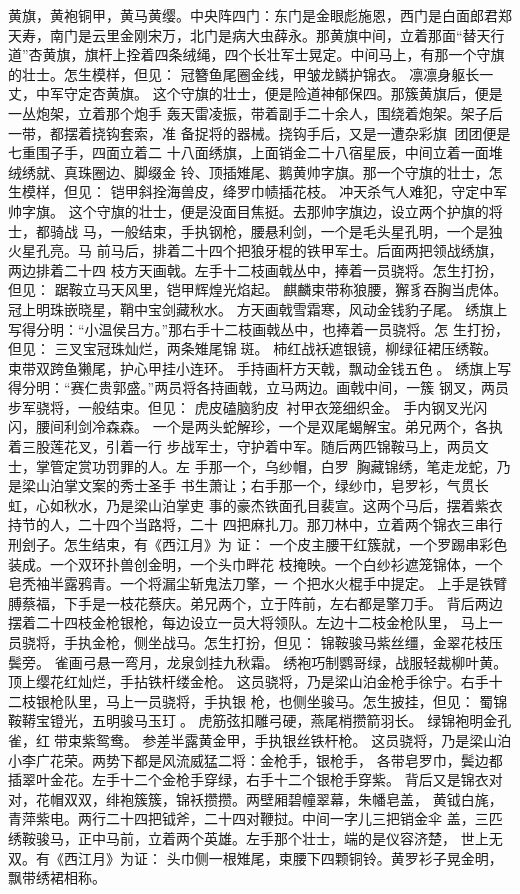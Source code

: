 黄旗，黄袍铜甲，黄马黄缨。中央阵四门：东门是金眼彪施恩，西门是白面郎君郑
天寿，南门是云里金刚宋万，北门是病大虫薛永。那黄旗中间，立着那面“替天行
道”杏黄旗，旗杆上拴着四条绒绳，四个长壮军士晃定。中间马上，有那一个守旗
的壮士。怎生模样，但见：
冠簪鱼尾圈金线，甲皱龙鳞护锦衣。
凛凛身躯长一丈，中军守定杏黄旗。
这个守旗的壮士，便是险道神郁保四。那簇黄旗后，便是一丛炮架，立着那个炮手
轰天雷凌振，带着副手二十余人，围绕着炮架。架子后一带，都摆着挠钩套索，准
备捉将的器械。挠钩手后，又是一遭杂彩旗，团团便是七重围子手，四面立着二
十八面绣旗，上面销金二十八宿星辰，中间立着一面堆绒绣就、真珠圈边、脚缀金
铃、顶插雉尾、鹅黄帅字旗。那一个守旗的壮士，怎生模样，但见：
铠甲斜拴海兽皮，绛罗巾帻插花枝。
冲天杀气人难犯，守定中军帅字旗。
这个守旗的壮士，便是没面目焦挺。去那帅字旗边，设立两个护旗的将士，都骑战
马，一般结束，手执钢枪，腰悬利剑，一个是毛头星孔明，一个是独火星孔亮。马
前马后，排着二十四个把狼牙棍的铁甲军士。后面两把领战绣旗，两边排着二十四
枝方天画戟。左手十二枝画戟丛中，捧着一员骁将。怎生打扮，但见：
踞鞍立马天风里，铠甲辉煌光焰起。
麒麟束带称狼腰，獬豸吞胸当虎体。
冠上明珠嵌晓星，鞘中宝剑藏秋水。
方天画戟雪霜寒，风动金钱豹子尾。
绣旗上写得分明：“小温侯吕方。”那右手十二枝画戟丛中，也捧着一员骁将。怎
生打扮，但见：
三叉宝冠珠灿烂，两条雉尾锦斑。
柿红战袄遮银镜，柳绿征裙压绣鞍。
束带双跨鱼獭尾，护心甲挂小连环。
手持画杆方天戟，飘动金钱五色。
绣旗上写得分明：“赛仁贵郭盛。”两员将各持画戟，立马两边。画戟中间，一簇
钢叉，两员步军骁将，一般结束。但见：
虎皮磕脑豹皮，衬甲衣笼细织金。
手内钢叉光闪闪，腰间利剑冷森森。
一个是两头蛇解珍，一个是双尾蝎解宝。弟兄两个，各执着三股莲花叉，引着一行
步战军士，守护着中军。随后两匹锦鞍马上，两员文士，掌管定赏功罚罪的人。左
手那一个，乌纱帽，白罗，胸藏锦绣，笔走龙蛇，乃是梁山泊掌文案的秀士圣手
书生萧让；右手那一个，绿纱巾，皂罗衫，气贯长虹，心如秋水，乃是梁山泊掌吏
事的豪杰铁面孔目裴宣。这两个马后，摆着紫衣持节的人，二十四个当路将，二十
四把麻扎刀。那刀林中，立着两个锦衣三串行刑刽子。怎生结束，有《西江月》为
证：
一个皮主腰干红簇就，一个罗踢串彩色装成。一个双环扑兽创金明，一个头巾畔花
枝掩映。一个白纱衫遮笼锦体，一个皂秃袖半露鸦青。一个将漏尘斩鬼法刀擎，一
个把水火棍手中提定。
上手是铁臂膊蔡福，下手是一枝花蔡庆。弟兄两个，立于阵前，左右都是擎刀手。
背后两边摆着二十四枝金枪银枪，每边设立一员大将领队。左边十二枝金枪队里，
马上一员骁将，手执金枪，侧坐战马。怎生打扮，但见：
锦鞍骏马紫丝缰，金翠花枝压鬓旁。
雀画弓悬一弯月，龙泉剑挂九秋霜。
绣袍巧制鹦哥绿，战服轻裁柳叶黄。
顶上缨花红灿烂，手拈铁杆缕金枪。
这员骁将，乃是梁山泊金枪手徐宁。右手十二枝银枪队里，马上一员骁将，手执银
枪，也侧坐骏马。怎生披挂，但见：
蜀锦鞍鞯宝镫光，五明骏马玉玎。
虎筋弦扣雕弓硬，燕尾梢攒箭羽长。
绿锦袍明金孔雀，红带束紫鸳鸯。
参差半露黄金甲，手执银丝铁杆枪。
这员骁将，乃是梁山泊小李广花荣。两势下都是风流威猛二将：金枪手，银枪手，
各带皂罗巾，鬓边都插翠叶金花。左手十二个金枪手穿绿，右手十二个银枪手穿紫。
背后又是锦衣对对，花帽双双，绯袍簇簇，锦袄攒攒。两壁厢碧幢翠幕，朱幡皂盖，
黄钺白旄，青萍紫电。两行二十四把钺斧，二十四对鞭挝。中间一字儿三把销金伞
盖，三匹绣鞍骏马，正中马前，立着两个英雄。左手那个壮士，端的是仪容济楚，
世上无双。有《西江月》为证：
头巾侧一根雉尾，束腰下四颗铜铃。黄罗衫子晃金明，飘带绣裙相称。

